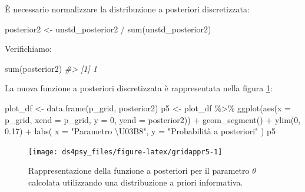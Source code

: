 \documentclass[
  11pt,
]{krantz}
\makeatletter
\newenvironment{Shaded}{\begin{snugshade}}{\end{snugshade}}
\newcommand{\AttributeTok}[1]{\textcolor[rgb]{0.61,0.61,0.61}{#1}}
\newcommand{\CommentTok}[1]{\textcolor[rgb]{0.37,0.37,0.37}{\textit{#1}}}
\newcommand{\DecValTok}[1]{\textcolor[rgb]{0.06,0.06,0.06}{#1}}
\newcommand{\FloatTok}[1]{\textcolor[rgb]{0.06,0.06,0.06}{#1}}
\newcommand{\FunctionTok}[1]{\textcolor[rgb]{0,0,0}{#1}}
\newcommand{\NormalTok}[1]{#1}
\newcommand{\OtherTok}[1]{\textcolor[rgb]{0.37,0.37,0.37}{#1}}
\newcommand{\SpecialCharTok}[1]{\textcolor[rgb]{0,0,0}{#1}}
\newcommand{\StringTok}[1]{\textcolor[rgb]{0.5,0.5,0.5}{#1}}
\newenvironment{kframe}{%
\medskip{}
\setlength{\fboxsep}{.8em}
 \def\at@end@of@kframe{}%
 \ifinner\ifhmode%
  \def\at@end@of@kframe{\end{minipage}}%
  \begin{minipage}{\columnwidth}%
 \fi\fi%
 \def\FrameCommand##1{\hskip\@totalleftmargin \hskip-\fboxsep
 \colorbox{shadecolor}{##1}\hskip-\fboxsep
     \hskip-\linewidth \hskip-\@totalleftmargin \hskip\columnwidth}%
 \MakeFramed {\advance\hsize-\width
   \@totalleftmargin\z@ \linewidth\hsize
   \@setminipage}}%
 {\par\unskip\endMakeFramed%
 \at@end@of@kframe}
\renewenvironment{Shaded}{\begin{kframe}}{\end{kframe}}
\theoremstyle{definition}
\theoremstyle{definition}
\theoremstyle{definition}
\theoremstyle{definition}
\theoremstyle{remark}
\makeatother
\begin{document}
\noindent È necessario normalizzare la distribuzione a posteriori discretizzata:

\begin{Shaded}
\begin{Highlighting}[]
\NormalTok{posterior2 }\OtherTok{\textless{}{-}}\NormalTok{ unstd\_posterior2 }\SpecialCharTok{/} \FunctionTok{sum}\NormalTok{(unstd\_posterior2)}
\end{Highlighting}
\end{Shaded}

\noindent Verifichiamo:

\begin{Shaded}
\begin{Highlighting}[]
\FunctionTok{sum}\NormalTok{(posterior2)}
\CommentTok{\#\textgreater{} [1] 1}
\end{Highlighting}
\end{Shaded}

\noindent La nuova funzione a posteriori discretizzata è rappresentata nella figura \ref{fig:gridappr5}:

\begin{Shaded}
\begin{Highlighting}[]
\NormalTok{plot\_df }\OtherTok{\textless{}{-}} \FunctionTok{data.frame}\NormalTok{(p\_grid, posterior2)}
\NormalTok{p5 }\OtherTok{\textless{}{-}}\NormalTok{ plot\_df }\SpecialCharTok{\%\textgreater{}\%}
  \FunctionTok{ggplot}\NormalTok{(}\FunctionTok{aes}\NormalTok{(}\AttributeTok{x =}\NormalTok{ p\_grid, }\AttributeTok{xend =}\NormalTok{ p\_grid, }\AttributeTok{y =} \DecValTok{0}\NormalTok{, }\AttributeTok{yend =}\NormalTok{ posterior2)) }\SpecialCharTok{+}
  \FunctionTok{geom\_segment}\NormalTok{() }\SpecialCharTok{+}
  \FunctionTok{ylim}\NormalTok{(}\DecValTok{0}\NormalTok{, }\FloatTok{0.17}\NormalTok{) }\SpecialCharTok{+}
  \FunctionTok{labs}\NormalTok{(}
    \AttributeTok{x =} \StringTok{"Parametro \textbackslash{}U03B8"}\NormalTok{,}
    \AttributeTok{y =} \StringTok{"Probabilità a posteriori"}
\NormalTok{  )}
\NormalTok{p5}
\end{Highlighting}
\end{Shaded}

\begin{figure}[h]

{\centering \texttt{[image: ds4psy\_files/figure-latex/gridappr5-1]} 

}

\caption{Rappresentazione della funzione a posteriori per il parametro $\theta$ calcolata utilizzando una distribuzione a priori informativa.}\label{fig:gridappr5}
\end{figure}
\end{document}
